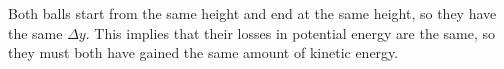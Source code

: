 Both balls start from the same height and end at the same height, so they have the same 
$\Delta y$. This implies that their
losses in potential energy are the same, so they must both have gained the same amount of kinetic energy.



